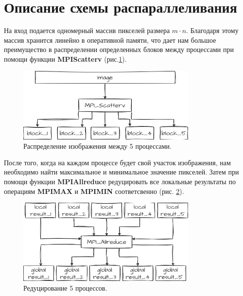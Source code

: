 \section*{Описание схемы распараллеливания}

На вход подается одномерный массив пикселей размера $m\cdot n$. Благодаря этому массив хранится линейно в оперативной памяти, что дает нам большое преимущество в распределении определенных блоков между процессами при помощи функции \textbf{MPI\textunderscore Scatterv} (рис.\ref{fig:distrImage}).

\vspace{5mm}

\begin{figure}[h!]
\centering
\includegraphics[width=0.8\textwidth]{images/distrImage.png}
\caption{Распределение изображения между 5 процессами.}
\label{fig:distrImage}
\end{figure}

\vspace{5mm}

После того, когда на каждом процессе будет свой участок изображения, нам необходимо найти максимальное и минимальное значение пикселей. Затем при помощи функции \textbf{MPI\textunderscore Allreduce} редуцировать все локальные результаты по операциям \textbf{MPI\textunderscore MAX} и \textbf{MPI\textunderscore MIN} соответсвенно (рис. \ref{fig:allreduce}).

\vspace{5mm}

\begin{figure}[h!]
\centering
\includegraphics[width=0.8\textwidth]{images/MPI_Allreduce.png}
\caption{Редуцирование 5 процессов.}
\label{fig:allreduce}
\end{figure}

